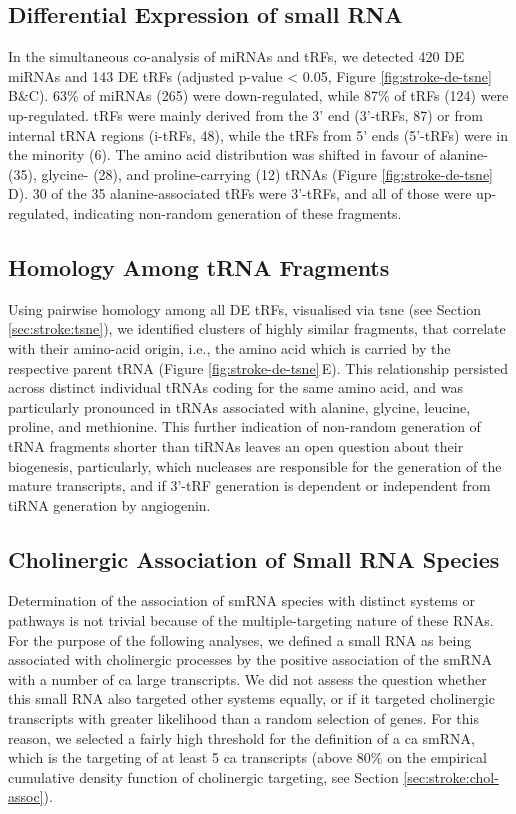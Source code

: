 \subsection{Differential Expression of small RNA}
In the simultaneous co-analysis of miRNAs and tRFs, we detected 420 DE miRNAs and 143 DE tRFs (adjusted p-value < 0.05, Figure \ref{fig:stroke-de-tsne}\,B\&C). 63\% of miRNAs (265) were down-regulated, while 87\% of tRFs (124) were up-regulated. tRFs were mainly derived from the 3' end (3'-tRFs, 87) or from internal tRNA regions (i-tRFs, 48), while the tRFs from 5' ends (5'-tRFs) were in the minority (6). The amino acid distribution was shifted in favour of alanine- (35), glycine- (28), and proline-carrying (12) tRNAs (Figure \ref{fig:stroke-de-tsne}\,D). 30 of the 35 alanine-associated tRFs were 3'-tRFs, and all of those were up-regulated, indicating non-random generation of these fragments.

\subsection{Homology Among tRNA Fragments}
Using pairwise homology among all DE tRFs, visualised via \ac{tsne} (see Section \ref{sec:stroke:tsne}), we identified clusters of highly similar fragments, that correlate with their amino-acid origin, i.e., the amino acid which is carried by the respective parent tRNA (Figure \ref{fig:stroke-de-tsne}\,E). This relationship persisted across distinct individual tRNAs coding for the same amino acid, and was particularly pronounced in tRNAs associated with alanine, glycine, leucine, proline, and methionine. This further indication of non-random generation of tRNA fragments shorter than tiRNAs leaves an open question about their biogenesis, particularly, which nucleases are responsible for the generation of the mature transcripts, and if 3'-tRF generation is dependent or independent from tiRNA generation by angiogenin.

\subsection{Cholinergic Association of Small RNA Species}
Determination of the association of smRNA species with distinct systems or pathways is not trivial because of the multiple-targeting nature of these RNAs. For the purpose of the following analyses, we defined a small RNA as being associated with cholinergic processes by the positive association of the smRNA with a number of \acf{ca} large transcripts. We did not assess the question whether this small RNA also targeted other systems equally, or if it targeted cholinergic transcripts with greater likelihood than a random selection of genes. For this reason, we selected a fairly high threshold for the definition of a \ac{ca} smRNA, which is the targeting of at least 5 \ac{ca} transcripts (above 80\% on the empirical cumulative density function of cholinergic targeting, see Section \ref{sec:stroke:chol-assoc}).

